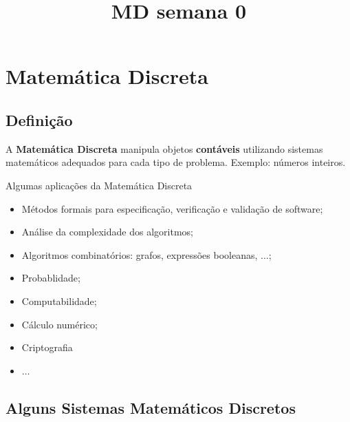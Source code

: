     
    \def\br{\hspace*{\fill} \\* }
    \def\gt{>}
    \def\lt{<}
    \let\Oldtex\TeX
    \let\Oldlatex\LaTeX
    \renewcommand{\TeX}{\textrm{\Oldtex}}
    \renewcommand{\LaTeX}{\textrm{\Oldlatex}}
    \title{MD semana 0}
    
    \sloppy 
    \hypersetup{
      breaklinks=true,  %
      colorlinks=true,
      urlcolor=urlcolor,
      linkcolor=linkcolor,
      citecolor=citecolor,
      }
    
\hypertarget{matemuxe1tica-discreta}{%
\section{Matemática Discreta}\label{matemuxe1tica-discreta}}

\hypertarget{definiuxe7uxe3o}{%
\subsection{Definição}\label{definiuxe7uxe3o}}

A \textbf{Matemática Discreta} manipula objetos \textbf{contáveis}
utilizando sistemas matemáticos adequados para cada tipo de problema.
Exemplo: números inteiros.

Algumas aplicações da Matemática Discreta

\begin{itemize}
\item
  Métodos formais para especificação, verificação e validação de
  software;
\item
  Análise da complexidade dos algoritmos;
\item
  Algoritmos combinatórios: grafos, expressões booleanas, \(\dots\);
\item
  Probablidade;
\item
  Computabilidade;
\item
  Cálculo numérico;
\item
  Criptografia
\item
  \(\dots\)
\end{itemize}

    \hypertarget{alguns-sistemas-matemuxe1ticos-discretos}{%
\subsection{Alguns Sistemas Matemáticos
Discretos}\label{alguns-sistemas-matemuxe1ticos-discretos}}

